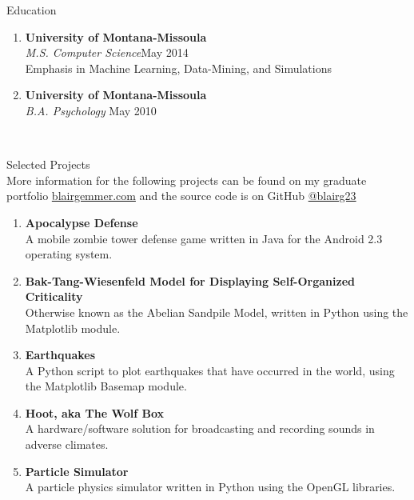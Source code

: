\documentclass[oneside]{article}%
\begin{document}
\noindent
\huge{Education}
\normalsize
\begin{enumerate}[]
\item \textbf{University of Montana-Missoula}\\
\vspace{2mm}
	\textit{M.S. Computer Science}\hfill May 2014\\
	Emphasis in Machine Learning, Data-Mining, and Simulations
	\
\item \textbf{University of Montana-Missoula}\\
	\textit{B.A. Psychology} \hfill May 2010
	\
\end{enumerate}
\

\noindent
\huge{Selected Projects}\\
\normalsize
More information for the following projects can be found on my graduate portfolio \href{blairgemmer.com}{blairgemmer.com} and the source code is on GitHub \href{https://github.com/blairg23}{@blairg23}
\begin{enumerate}[]
	\item \textbf{Apocalypse Defense}\\
		A mobile zombie tower defense game written in Java for the Android 2.3 operating system.
	\item \textbf{Bak-Tang-Wiesenfeld Model for Displaying Self-Organized\\ Criticality}\\
		Otherwise known as the Abelian Sandpile Model, written in Python using the Matplotlib module.
	\item \textbf{Earthquakes}\\
		A Python script to plot earthquakes that have occurred in the world, using the Matplotlib Basemap module.
	\item \textbf{Hoot, aka The Wolf Box}\\
		A hardware/software solution for broadcasting and recording sounds in adverse climates.
	\item \textbf{Particle Simulator}\\
		A particle physics simulator written in Python using the OpenGL libraries.
\end{enumerate}
\end{document}
